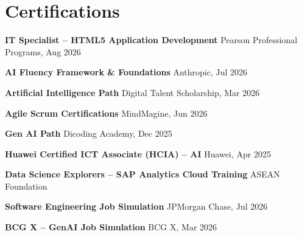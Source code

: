 \section*{Certifications}

\textbf{IT Specialist -- HTML5 Application Development} \hfill
Pearson Professional Programs, Aug 2026

\textbf{AI Fluency Framework \& Foundations} \hfill
Anthropic, Jul 2026

\textbf{Artificial Intelligence Path} \hfill
Digital Talent Scholarship, Mar 2026

\textbf{Agile Scrum Certifications} \hfill
MindMagine, Jun 2026

\textbf{Gen AI Path} \hfill
Dicoding Academy, Dec 2025

\textbf{Huawei Certified ICT Associate (HCIA) -- AI} \hfill
Huawei, Apr 2025

\textbf{Data Science Explorers -- SAP Analytics Cloud Training} \hfill
ASEAN Foundation

\textbf{Software Engineering Job Simulation} \hfill
JPMorgan Chase, Jul 2026

\textbf{BCG X -- GenAI Job Simulation} \hfill
BCG X, Mar 2026